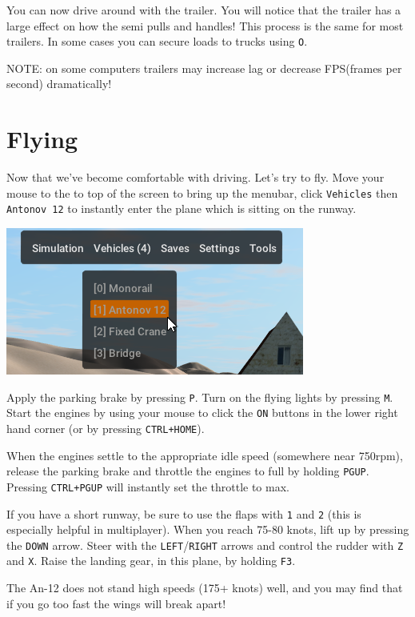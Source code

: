 You can now drive around with the trailer. You will notice that the
trailer has a large effect on how the semi pulls and handles! This
process is the same for most trailers. In some cases you can secure
loads to trucks using \texttt{O}.

NOTE: on some computers trailers may increase lag or decrease FPS(frames
per second) dramatically!

\hypertarget{flying}{%
\section{Flying}\label{flying}}

Now that we've become comfortable with driving. Let's try to fly. Move
your mouse to the to top of the screen to bring up the menubar, click
\texttt{Vehicles} then \texttt{Antonov\ 12} to instantly enter the plane
which is sitting on the runway.


\includegraphics{images/bg-planeselect.png}


Apply the parking brake by pressing \texttt{P}. Turn on the flying
lights by pressing \texttt{M}. Start the engines by using your mouse to
click the \texttt{ON} buttons in the lower right hand corner (or by
pressing \texttt{CTRL+HOME}).

When the engines settle to the appropriate idle speed (somewhere near
750rpm), release the parking brake and throttle the engines to full by
holding \texttt{PGUP}. Pressing \texttt{CTRL+PGUP} will instantly set
the throttle to max.

If you have a short runway, be sure to use the flaps with \texttt{1} and
\texttt{2} (this is especially helpful in multiplayer). When you reach
75-80 knots, lift up by pressing the \texttt{DOWN} arrow. Steer with the
\texttt{LEFT}/\texttt{RIGHT} arrows and control the rudder with
\texttt{Z} and \texttt{X}. Raise the landing gear, in this plane, by
holding \texttt{F3}.

The An-12 does not stand high speeds (175+ knots) well, and you may find
that if you go too fast the wings will break apart!

